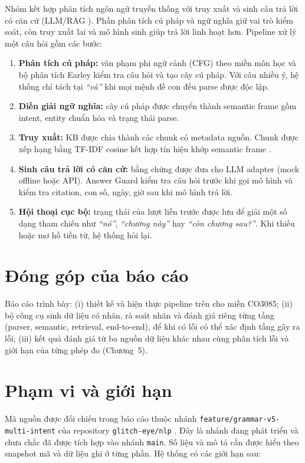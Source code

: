Nhóm kết hợp phân tích ngôn ngữ truyền thống với truy xuất và sinh câu trả lời có căn cứ (LLM/RAG \cite{lewis-rag}). Phần phân tích cú pháp và ngữ nghĩa giữ vai trò kiểm soát, còn truy xuất lai và mô hình sinh giúp trả lời linh hoạt hơn. Pipeline xử lý một câu hỏi gồm các bước:

\begin{enumerate}
  \item \textbf{Phân tích cú pháp:} văn phạm phi ngữ cảnh (CFG) theo miền môn học và bộ phân tích Earley \cite{earley-1970} kiểm tra câu hỏi và tạo cây cú pháp. Với câu nhiều ý, hệ thống chỉ tách tại \emph{``và''} khi mọi mệnh đề con đều parse được độc lập.
  \item \textbf{Diễn giải ngữ nghĩa:} cây cú pháp được chuyển thành semantic frame gồm intent, entity chuẩn hóa và trạng thái parse.
  \item \textbf{Truy xuất:} KB được chia thành các chunk có metadata nguồn. Chunk được xếp hạng bằng TF-IDF cosine kết hợp tín hiệu khớp semantic frame \cite{manning-ir}.
  \item \textbf{Sinh câu trả lời có căn cứ:} bằng chứng được đưa cho LLM adapter (mock offline hoặc API). Answer Guard kiểm tra câu hỏi trước khi gọi mô hình và kiểm tra citation, con số, ngày, giờ sau khi mô hình trả lời.
  \item \textbf{Hội thoại cục bộ:} trạng thái của lượt liền trước được lưu để giải một số dạng tham chiếu như \emph{``nó''}, \emph{``chương này''} hay \emph{``còn chương sau?''}. Khi thiếu hoặc mơ hồ tiền từ, hệ thống hỏi lại.
\end{enumerate}

\section{Đóng góp của báo cáo}

Báo cáo trình bày: (i) thiết kế và hiện thực pipeline trên cho miền CO3085; (ii) bộ công cụ sinh dữ liệu có nhãn, rà soát nhãn và đánh giá riêng từng tầng (parser, semantic, retrieval, end-to-end), để khi có lỗi có thể xác định tầng gây ra lỗi; (iii) kết quả đánh giá từ ba nguồn dữ liệu khác nhau cùng phân tích lỗi và giới hạn của từng phép đo (Chương~5).

\section{Phạm vi và giới hạn}

Mã nguồn được đối chiếu trong báo cáo thuộc nhánh \texttt{feature/grammar-v5-multi-intent} của repository \texttt{glitch-eye/nlp} \cite{nlp-repository}. Đây là nhánh đang phát triển và chưa chắc đã được tích hợp vào nhánh \texttt{main}. Số liệu và mô tả cần được hiểu theo snapshot mã và dữ liệu ghi ở từng phần. Hệ thống có các giới hạn sau:

